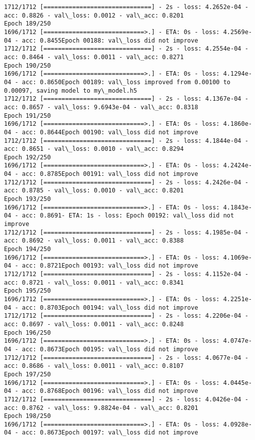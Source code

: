 \documentclass[11pt]{article}
\begin{document}
\begin{Verbatim}[commandchars=\\\{\}]
1712/1712 [==============================] - 2s - loss: 4.2652e-04 - acc: 0.8826 - val\_loss: 0.0012 - val\_acc: 0.8201
Epoch 189/250
1696/1712 [============================>.] - ETA: 0s - loss: 4.2569e-04 - acc: 0.8455Epoch 00188: val\_loss did not improve
1712/1712 [==============================] - 2s - loss: 4.2554e-04 - acc: 0.8464 - val\_loss: 0.0011 - val\_acc: 0.8271
Epoch 190/250
1696/1712 [============================>.] - ETA: 0s - loss: 4.1294e-04 - acc: 0.8650Epoch 00189: val\_loss improved from 0.00100 to 0.00097, saving model to my\_model.h5
1712/1712 [==============================] - 2s - loss: 4.1367e-04 - acc: 0.8657 - val\_loss: 9.6943e-04 - val\_acc: 0.8318
Epoch 191/250
1696/1712 [============================>.] - ETA: 0s - loss: 4.1860e-04 - acc: 0.8644Epoch 00190: val\_loss did not improve
1712/1712 [==============================] - 2s - loss: 4.1844e-04 - acc: 0.8651 - val\_loss: 0.0010 - val\_acc: 0.8294
Epoch 192/250
1696/1712 [============================>.] - ETA: 0s - loss: 4.2424e-04 - acc: 0.8785Epoch 00191: val\_loss did not improve
1712/1712 [==============================] - 2s - loss: 4.2426e-04 - acc: 0.8785 - val\_loss: 0.0010 - val\_acc: 0.8201
Epoch 193/250
1696/1712 [============================>.] - ETA: 0s - loss: 4.1843e-04 - acc: 0.8691- ETA: 1s - loss: Epoch 00192: val\_loss did not improve
1712/1712 [==============================] - 2s - loss: 4.1985e-04 - acc: 0.8692 - val\_loss: 0.0011 - val\_acc: 0.8388
Epoch 194/250
1696/1712 [============================>.] - ETA: 0s - loss: 4.1069e-04 - acc: 0.8721Epoch 00193: val\_loss did not improve
1712/1712 [==============================] - 2s - loss: 4.1152e-04 - acc: 0.8721 - val\_loss: 0.0011 - val\_acc: 0.8341
Epoch 195/250
1696/1712 [============================>.] - ETA: 0s - loss: 4.2251e-04 - acc: 0.8703Epoch 00194: val\_loss did not improve
1712/1712 [==============================] - 2s - loss: 4.2206e-04 - acc: 0.8697 - val\_loss: 0.0011 - val\_acc: 0.8248
Epoch 196/250
1696/1712 [============================>.] - ETA: 0s - loss: 4.0747e-04 - acc: 0.8673Epoch 00195: val\_loss did not improve
1712/1712 [==============================] - 2s - loss: 4.0677e-04 - acc: 0.8686 - val\_loss: 0.0011 - val\_acc: 0.8107
Epoch 197/250
1696/1712 [============================>.] - ETA: 0s - loss: 4.0445e-04 - acc: 0.8768Epoch 00196: val\_loss did not improve
1712/1712 [==============================] - 2s - loss: 4.0426e-04 - acc: 0.8762 - val\_loss: 9.8824e-04 - val\_acc: 0.8201
Epoch 198/250
1696/1712 [============================>.] - ETA: 0s - loss: 4.0928e-04 - acc: 0.8673Epoch 00197: val\_loss did not improve

\end{Verbatim}
\end{document}
